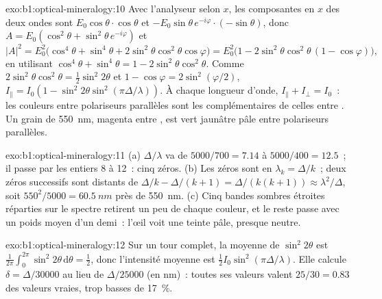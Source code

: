 \begin{solution}{exo:b1:optical-mineralogy:10}
Avec l'analyseur selon $x$, les composantes en $x$ des deux ondes sont
$E_0\cos\theta\cdot\cos\theta$ et $-E_0\sin\theta\,e^{-i\varphi}\cdot(-\sin\theta)$,
donc $A = E_0(\cos^2\theta + \sin^2\theta\,e^{-i\varphi})$ et
\[
  |A|^2 = E_0^2\bigl(\cos^4\theta + \sin^4\theta + 2\sin^2\theta\cos^2\theta\cos\varphi\bigr)
  = E_0^2\bigl(1 - 2\sin^2\theta\cos^2\theta\,(1 - \cos\varphi)\bigr),
\]
en utilisant $\cos^4\theta + \sin^4\theta = 1 - 2\sin^2\theta\cos^2\theta$. Comme
$2\sin^2\theta\cos^2\theta = \frac12\sin^2 2\theta$ et $1 - \cos\varphi =
2\sin^2(\varphi/2)$, $I_\parallel = I_0(1 - \sin^2 2\theta\sin^2(\pi\Delta/\lambda))$.
À chaque longueur d'onde, $I_\parallel + I_\perp = I_0$~: les couleurs entre
polariseurs parallèles sont les complémentaires de celles entre . Un grain de  \qty{550}{nm}, magenta entre
, est vert jaunâtre pâle entre polariseurs parallèles.
\end{solution}

\begin{solution}{exo:b1:optical-mineralogy:11}
(a) $\Delta/\lambda$ va de $5000/700 = 7.14$ à $5000/400 = 12.5$~; il passe par
les entiers 8 à 12~: cinq zéros. (b) Les zéros sont en $\lambda_k = \Delta/k$~;
deux zéros successifs sont distants de $\Delta/k - \Delta/(k + 1) =
\Delta/(k(k + 1)) \approx \lambda^2/\Delta$, soit $550^2/5000 =
\qty{60.5}{nm}$ près de \qty{550}{nm}. (c) Cinq bandes sombres étroites réparties
sur le spectre retirent un peu de chaque couleur, et le reste passe avec un poids
moyen d'un demi~: l'œil voit une teinte pâle, presque neutre.
\end{solution}

\begin{solution}{exo:b1:optical-mineralogy:12}
Sur un tour complet, la moyenne de $\sin^2 2\theta$ est $\frac1{2\pi}\int_0^{2\pi}\sin^2 2\theta\,
\mathrm d\theta = \frac12$, donc l'intensité moyenne est
$\frac12 I_0\sin^2(\pi\Delta/\lambda)$. Elle calcule $\delta = \Delta/30000$
au lieu de $\Delta/25000$ (en nm)~: toutes ses valeurs valent $25/30 = 0.83$ des
valeurs vraies, trop basses de \qty{17}{\percent}.
\end{solution}

